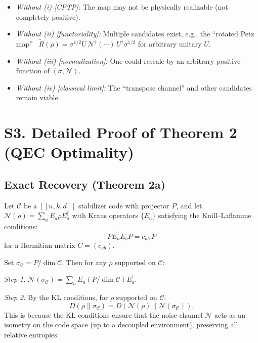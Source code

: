 \documentclass[prl,twocolumn,superscriptaddress,longbibliography]{revtex4-2}
\newcommand{\chan}{\mathcal{N}}
\newcommand{\code}{\mathcal{C}}
\begin{document}
\begin{itemize}
\item \emph{Without (i) [CPTP]:} The map may not be physically
  realizable (not completely positive).
\item \emph{Without (ii) [functoriality]:} Multiple candidates exist,
  e.g., the ``rotated Petz map''~\cite{Wilde2015}
  $\tilde{R}(\rho) = \sigma^{1/2} U\, \chan^\dagger(\cdots)\,
  U^\dagger \sigma^{1/2}$ for arbitrary unitary $U$.
\item \emph{Without (iii) [normalization]:} One could rescale by an
  arbitrary positive function of $(\sigma, \chan)$.
\item \emph{Without (iv) [classical limit]:} The ``transpose channel''
  and other candidates remain viable.
\end{itemize}

\section{S3. Detailed Proof of Theorem 2 (QEC Optimality)}
\label{sec:proof_theorem2}

\subsection{Exact Recovery (Theorem 2a)}

Let $\code$ be a $[\![n,k,d]\!]$ stabilizer code with projector $P$,
and let $\chan(\rho) = \sum_a E_a \rho E_a^\dagger$ with Kraus
operators $\{E_a\}$ satisfying the Knill--Laflamme conditions:
\begin{equation}
P E_a^\dagger E_b P = c_{ab}\, P
\label{eq:KL}
\end{equation}
for a Hermitian matrix $C = (c_{ab})$.

Set $\sigma_\code = P/\dim\code$. Then for any $\rho$ supported on
$\code$:

\emph{Step 1:} $\chan(\sigma_\code) = \sum_a E_a (P/\dim\code)
E_a^\dagger$.

\emph{Step 2:} By the KL conditions, for $\rho$ supported on
$\code$:
\begin{equation}
D(\rho\|\sigma_\code) = D(\chan(\rho)\|\chan(\sigma_\code)).
\end{equation}
This is because the KL conditions ensure that the noise channel $\chan$
acts as an isometry on the code space (up to a decoupled environment),
preserving all relative entropies.
\end{document}
